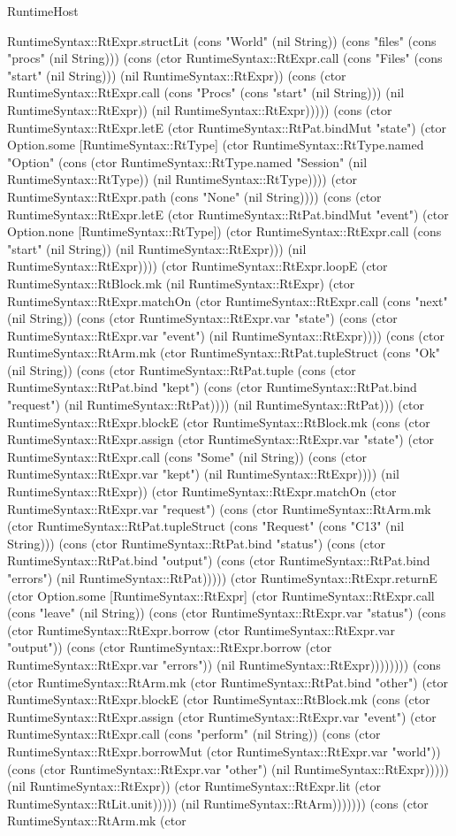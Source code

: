 \begin{lexlean}{RuntimeHost}
\begin{semanticmodule}
{RuntimeSyntax::RtExpr.structLit (cons "World" (nil String)) (cons "files" (cons "procs" (nil String))) (cons (ctor RuntimeSyntax::RtExpr.call (cons "Files" (cons "start" (nil String))) (nil RuntimeSyntax::RtExpr)) (cons (ctor RuntimeSyntax::RtExpr.call (cons "Procs" (cons "start" (nil String))) (nil RuntimeSyntax::RtExpr)) (nil RuntimeSyntax::RtExpr))))) (cons (ctor RuntimeSyntax::RtExpr.letE (ctor RuntimeSyntax::RtPat.bindMut "state") (ctor Option.some [RuntimeSyntax::RtType] (ctor RuntimeSyntax::RtType.named "Option" (cons (ctor RuntimeSyntax::RtType.named "Session" (nil RuntimeSyntax::RtType)) (nil RuntimeSyntax::RtType)))) (ctor RuntimeSyntax::RtExpr.path (cons "None" (nil String)))) (cons (ctor RuntimeSyntax::RtExpr.letE (ctor RuntimeSyntax::RtPat.bindMut "event") (ctor Option.none [RuntimeSyntax::RtType]) (ctor RuntimeSyntax::RtExpr.call (cons "start" (nil String)) (nil RuntimeSyntax::RtExpr))) (nil RuntimeSyntax::RtExpr)))) (ctor RuntimeSyntax::RtExpr.loopE (ctor RuntimeSyntax::RtBlock.mk (nil RuntimeSyntax::RtExpr) (ctor RuntimeSyntax::RtExpr.matchOn (ctor RuntimeSyntax::RtExpr.call (cons "next" (nil String)) (cons (ctor RuntimeSyntax::RtExpr.var "state") (cons (ctor RuntimeSyntax::RtExpr.var "event") (nil RuntimeSyntax::RtExpr)))) (cons (ctor RuntimeSyntax::RtArm.mk (ctor RuntimeSyntax::RtPat.tupleStruct (cons "Ok" (nil String)) (cons (ctor RuntimeSyntax::RtPat.tuple (cons (ctor RuntimeSyntax::RtPat.bind "kept") (cons (ctor RuntimeSyntax::RtPat.bind "request") (nil RuntimeSyntax::RtPat)))) (nil RuntimeSyntax::RtPat))) (ctor RuntimeSyntax::RtExpr.blockE (ctor RuntimeSyntax::RtBlock.mk (cons (ctor RuntimeSyntax::RtExpr.assign (ctor RuntimeSyntax::RtExpr.var "state") (ctor RuntimeSyntax::RtExpr.call (cons "Some" (nil String)) (cons (ctor RuntimeSyntax::RtExpr.var "kept") (nil RuntimeSyntax::RtExpr)))) (nil RuntimeSyntax::RtExpr)) (ctor RuntimeSyntax::RtExpr.matchOn (ctor RuntimeSyntax::RtExpr.var "request") (cons (ctor RuntimeSyntax::RtArm.mk (ctor RuntimeSyntax::RtPat.tupleStruct (cons "Request" (cons "C13" (nil String))) (cons (ctor RuntimeSyntax::RtPat.bind "status") (cons (ctor RuntimeSyntax::RtPat.bind "output") (cons (ctor RuntimeSyntax::RtPat.bind "errors") (nil RuntimeSyntax::RtPat))))) (ctor RuntimeSyntax::RtExpr.returnE (ctor Option.some [RuntimeSyntax::RtExpr] (ctor RuntimeSyntax::RtExpr.call (cons "leave" (nil String)) (cons (ctor RuntimeSyntax::RtExpr.var "status") (cons (ctor RuntimeSyntax::RtExpr.borrow (ctor RuntimeSyntax::RtExpr.var "output")) (cons (ctor RuntimeSyntax::RtExpr.borrow (ctor RuntimeSyntax::RtExpr.var "errors")) (nil RuntimeSyntax::RtExpr)))))))) (cons (ctor RuntimeSyntax::RtArm.mk (ctor RuntimeSyntax::RtPat.bind "other") (ctor RuntimeSyntax::RtExpr.blockE (ctor RuntimeSyntax::RtBlock.mk (cons (ctor RuntimeSyntax::RtExpr.assign (ctor RuntimeSyntax::RtExpr.var "event") (ctor RuntimeSyntax::RtExpr.call (cons "perform" (nil String)) (cons (ctor RuntimeSyntax::RtExpr.borrowMut (ctor RuntimeSyntax::RtExpr.var "world")) (cons (ctor RuntimeSyntax::RtExpr.var "other") (nil RuntimeSyntax::RtExpr))))) (nil RuntimeSyntax::RtExpr)) (ctor RuntimeSyntax::RtExpr.lit (ctor RuntimeSyntax::RtLit.unit))))) (nil RuntimeSyntax::RtArm))))))) (cons (ctor RuntimeSyntax::RtArm.mk (ctor }
\end{semanticmodule}
\end{lexlean}
